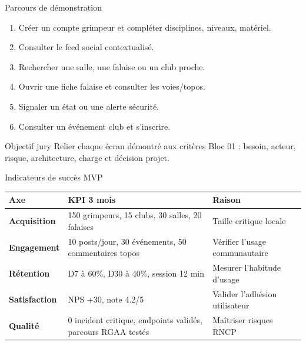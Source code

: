 \documentclass[aspectratio=169,11pt]{beamer}
\begin{document}
\begin{frame}{Parcours de démonstration}
  \begin{enumerate}
    \item Créer un compte grimpeur et compléter disciplines, niveaux, matériel.
    \item Consulter le feed social contextualisé.
    \item Rechercher une salle, une falaise ou un club proche.
    \item Ouvrir une fiche falaise et consulter les voies/topos.
    \item Signaler un état ou une alerte sécurité.
    \item Consulter un événement club et s'inscrire.
  \end{enumerate}
  \vspace{0.25cm}
  \begin{block}{Objectif jury}
    Relier chaque écran démontré aux critères Bloc 01 : besoin, acteur, risque, architecture, charge et décision projet.
  \end{block}
\end{frame}

\begin{frame}{Indicateurs de succès MVP}
  \small
  \begin{tabularx}{\textwidth}{>{\bfseries}p{3cm} X X}
    Axe & KPI 3 mois & Raison \\
    \hline
    Acquisition & 150 grimpeurs, 15 clubs, 30 salles, 20 falaises & Taille critique locale \\
    Engagement & 10 posts/jour, 30 événements, 50 commentaires topos & Vérifier l'usage communautaire \\
    Rétention & D7 à 60\%, D30 à 40\%, session 12 min & Mesurer l'habitude d'usage \\
    Satisfaction & NPS +30, note 4.2/5 & Valider l'adhésion utilisateur \\
    Qualité & 0 incident critique, endpoints validés, parcours RGAA testés & Maîtriser risques RNCP \\
  \end{tabularx}
\end{frame}
\end{document}
